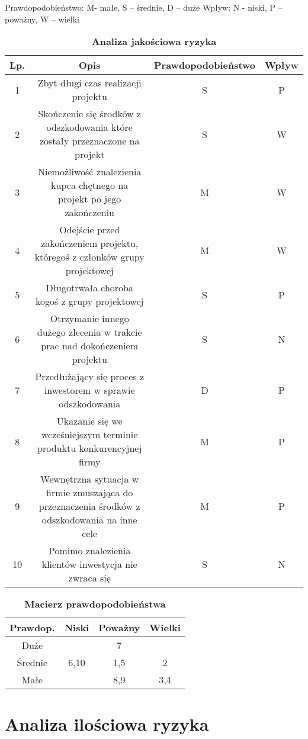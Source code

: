Prawdopodobieństwo:  M- małe, S – średnie, D – duże
Wpływ: N - niski, P – poważny, W – wielki

\begin{table}[htb]
\centering
\begin{tabular}{c|c|c|c} 
Lp. & Opis & Prawdopodobieństwo & Wpływ \\
 \hline 1 & Zbyt długi czas realizacji projektu & S & P \\
 2 & Skończenie się środków z odszkodowania które zostały przeznaczone na projekt & S & W \\
 3 & Niemożliwość znalezienia kupca chętnego na projekt po jego zakończeniu & M & W \\
 4 & Odejście przed zakończeniem projektu, któregoś z członków grupy projektowej & M & W \\
5 & Długotrwała choroba kogoś z grupy projektowej & S & P \\
6 & Otrzymanie innego dużego zlecenia w trakcie prac nad dokończeniem projektu & S & N \\
7 & Przedłużający się proces z inwestorem w sprawie odszkodowania & D & P \\
8 & Ukazanie się we wcześniejszym terminie produktu konkurencyjnej firmy & M & P \\
9 & Wewnętrzna sytuacja w firmie zmuszająca do przeznaczenia środków z odszkodowania na inne cele  & M & P  \\
10 & Pomimo znalezienia klientów inwestycja nie zwraca się &  S & N  \\
\end{tabular}
\caption{\textbf{Analiza jakościowa ryzyka}}
\label{tab:analizaJakosciowa}
\end{table}


\begin{table}[htb]
\centering
\begin{tabular}{c|c|c|c} Prawdop. & Niski & Poważny & Wielki \\
 \hline Duże &  & 7 &  \\
 Średnie & 6,10 & 1,5 & 2 \\
 Małe &  & 8,9  & 3,4  \\
\end{tabular}
\caption{\textbf{Macierz prawdopodobieństwa}}
\label{tab:macierzPrawdopodobienstwa}
\end{table}



\section{Analiza ilościowa ryzyka}

